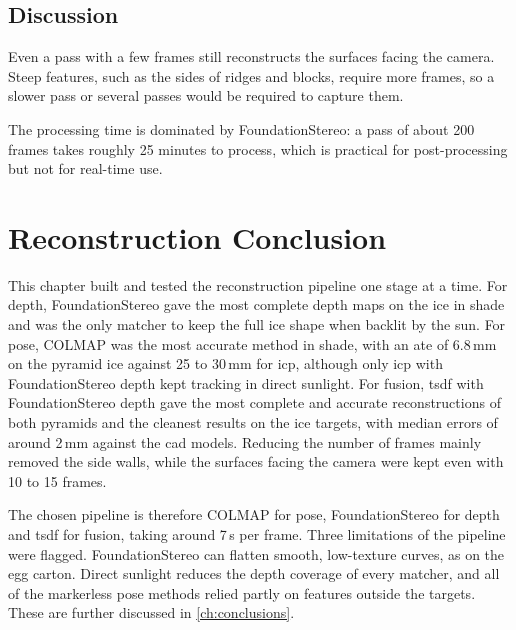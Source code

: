 \subsection{Discussion}
Even a pass with a few frames still reconstructs the surfaces facing the camera. Steep features, such as the sides of ridges and blocks, require more frames, so a
slower pass or several passes would be required to capture them. 

The processing time is dominated by FoundationStereo: a pass of about 200 frames takes roughly 25 minutes to process, which is practical for
post-processing but not for real-time use.



\section{Reconstruction Conclusion}
\label{sec:ch5.summary}
This chapter built and tested the reconstruction pipeline one stage at a time. For depth, FoundationStereo gave
the most complete depth maps on the ice in shade and was the only matcher to keep the full ice shape when backlit
by the sun. For pose, COLMAP was the most accurate method in shade, with an \gls{ate} of 6.8\,mm on the pyramid ice
against 25 to 30\,mm for \gls{icp}, although only \gls{icp} with FoundationStereo depth kept tracking in direct sunlight. For
fusion, \gls{tsdf} with FoundationStereo depth gave the most complete and accurate reconstructions of both pyramids and
the cleanest results on the ice targets, with median errors of around 2\,mm against the \gls{cad} models. Reducing the
number of frames mainly removed the side walls, while the surfaces facing the camera were kept even with
10 to 15 frames.

The chosen pipeline is therefore COLMAP for pose, FoundationStereo for depth and \gls{tsdf} for fusion, taking
around 7\,s per frame. Three limitations of the pipeline were flagged. FoundationStereo can flatten smooth, low-texture curves, as on the
egg carton. Direct sunlight reduces the depth coverage of every matcher, and all of the markerless pose methods
relied partly on features outside the targets. These are further discussed in \autoref{ch:conclusions}.